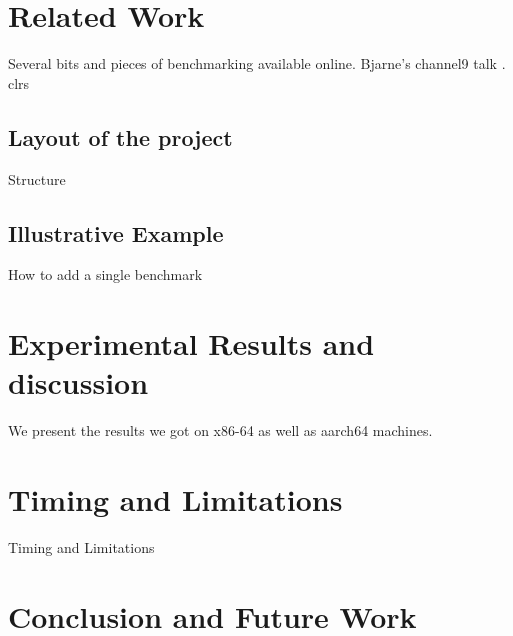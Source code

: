 \documentclass{sig-alternate}
\begin{document}
\section{Related Work}
Several bits and pieces of benchmarking available online.
Bjarne's channel9 talk \cite{stroustrup2012}.
clrs \cite{clrs}

\newpage

\subsection{Layout of the project}
Structure

\subsection{Illustrative Example} \label{subsec:example}
How to add a single benchmark
\newpage

\section{Experimental Results and discussion}
We present the results we got on x86-64 as well as aarch64 machines.

\section{Timing and Limitations}
Timing and Limitations

\section{Conclusion and Future Work}


{\small

}
\end{document}
